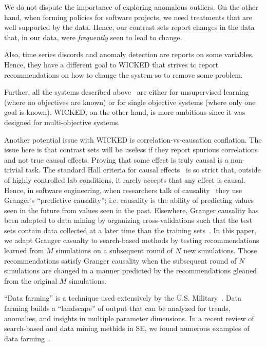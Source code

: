 \documentclass[runningheads]{llncs}
\begin{document}
We do not dispute the
importance of exploring anomalous outliers.  On the other
hand, when forming policies for software projects,
we need treatments that are well supported by the
data. Hence, our contrast sets report changes in the
data that, in our data, were {\em frequently} seen to
lead to change. 

Also, time series discords and anomaly detection are reports
on some variables. Hence, they have a different goal to WICKED that
strives to report recommendations on how to change the system
so to remove some problem. 

Further, all the systems described
above~\cite{voinea07,horvitz05,keogh05,gruska10} are
either for unsupervised learning (where no
objectives are known) or for single objective
systems (where only one goal is known). WICKED, on the
other hand, is more ambitious since it was designed
for multi-objective systems.

Another potential issue with WICKED is
correlation-vs-causation conflation. The issue here
is that contrast sets will be useless if they
report spurious correlations and not true causal
effects.  Proving that some effect is truly causal
is a non-trivial task.  The standard Hall criteria
for causal effects~\cite{paul13} is so strict that,
outside of highly controlled lab conditions, it
rarely accepts that any effect is causal.  Hence, in
software engineering, when researchers talk of
causality~\cite{couto14,zheng14z,huber09,bhat!icse12}
they use Granger's ``predictive causality'';
i.e. causality is the ability of predicting
values seen in the future from values seen in the
past.  Elsewhere, Granger causality has been adapted
to data mining by organizing cross-validations such
that the test sets contain data collected at a later
time than the training sets~\cite{me11f}.  In this
paper, we adapt Granger casualty to search-based
methods by testing recommendations learned from $M$
simulations on a subsequent round of $N$ new
simulations.  Those recommendations satisfy Granger
causality when the subsequent round of $N$
simulations are changed in a manner predicted by the
recommendations gleaned from the original $M$
simulations.


``Data farming'' is a technique used extensively by the
U.S. Military~\cite{meyer04}.
Data farming builds a ``landscape''
of output that can be analyzed for trends, anomalies, and insights in
multiple parameter dimensions.  
In  a recent review of search-based and data mining methids in SE,
we found numerous examples
of data farming~\cite{strickland03,Myrtveit,Shepperd01,pearce99,vanlamsweerde98integrating,chung00,me03j,heaven11,rodriguez11,jian09}.
\end{document}

